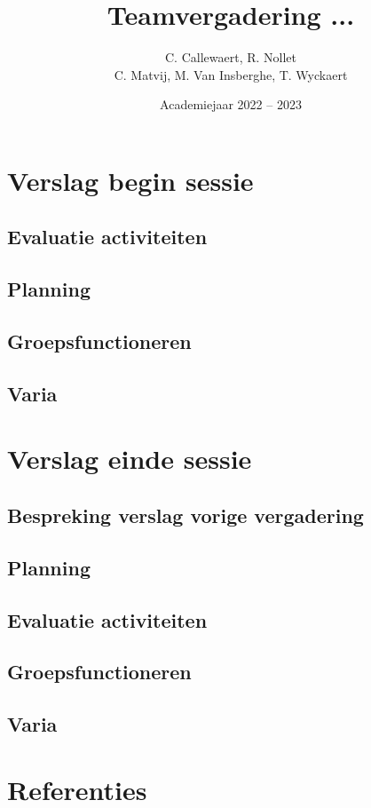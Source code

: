 \documentclass{kulakarticle}
\title{Teamvergadering ...}
\author{C. Callewaert, R. Nollet \\
	C. Matvij, M. Van Insberghe, T. Wyckaert }
\date{Academiejaar 2022 -- 2023}
\begin{document}
	\maketitle
\section{Verslag begin sessie}

	\subsection{Evaluatie activiteiten}
	\subsection{Planning}
	\subsection{Groepsfunctioneren}
	\subsection{Varia}
	
\section{Verslag einde sessie}

	\subsection{Bespreking verslag vorige vergadering}
	\subsection{Planning}
	\subsection{Evaluatie activiteiten}
	\subsection{Groepsfunctioneren}
	\subsection{Varia}
	
	\section*{Referenties}
\end{document}
